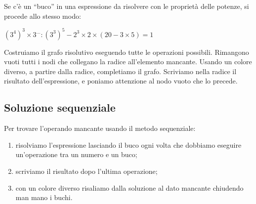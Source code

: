 \begin{esempio}{}{}
  Se c'è un ``buco'' in una espressione da risolvere con le proprietà delle 
  potenze, si procede allo stesso modo:
  
  \((3^4)^3 \times 3^{\dots} : (3^3)^5 -2^3 \times 2 \times 
  (20 -3 \times 5) = 1\)

Costruiamo il grafo risolutivo eseguendo tutte le operazioni possibili. 
Rimangono vuoti tutti i nodi che collegano la radice all'elemento
mancante. 
Usando un colore diverso, a partire dalla radice, completiamo il grafo. 
Scriviamo nella radice il risultato dell'espressione, e poniamo attenzione 
al nodo vuoto che lo precede.

\end{esempio}


\subsection{Soluzione sequenziale}

\begin{procedura}{}{}
 Per trovare l'operando mancante usando il metodo sequenziale:
\begin{enumerate} [noitemsep]
 \item risolviamo l'espressione lasciando il buco ogni volta che 
  dobbiamo eseguire un'operazione tra un numero e un buco;
 \item scriviamo il risultato dopo l'ultima operazione;
 \item con un colore diverso risaliamo dalla soluzione al dato mancante
  chiudendo man mano i buchi.
\end{enumerate}
\end{procedura}

